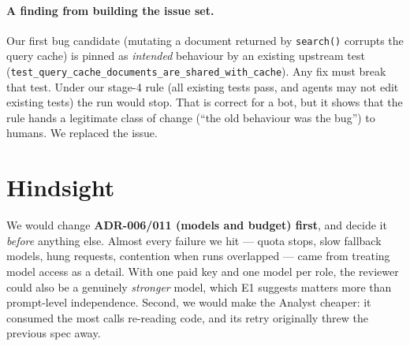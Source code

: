 \documentclass[10pt,a4paper]{article}
\newcommand{\code}[1]{\texttt{#1}}
\begin{document}
\paragraph{A finding from building the issue set.} Our first bug candidate (mutating a document returned
by \code{search()} corrupts the query cache) is pinned as \emph{intended} behaviour by an existing
upstream test (\code{test\_query\_cache\_documents\_are\_shared\_with\_cache}). Any fix must break that
test. Under our stage-4 rule (all existing tests pass, and agents may not edit existing tests) the run
would stop. That is correct for a bot, but it shows that the rule hands a legitimate class of change
(``the old behaviour was the bug'') to humans. We replaced the issue.

\section{Hindsight}
We would change \textbf{ADR-006/011 (models and budget) first}, and decide it \emph{before} anything
else. Almost every failure we hit --- quota stops, slow fallback models, hung requests, contention when
runs overlapped --- came from treating model access as a detail. With one paid key and one model per
role, the reviewer could also be a genuinely \emph{stronger} model, which E1 suggests matters more than
prompt-level independence. Second, we would make the Analyst cheaper: it consumed the most calls
re-reading code, and its retry originally threw the previous spec away.
\end{document}
